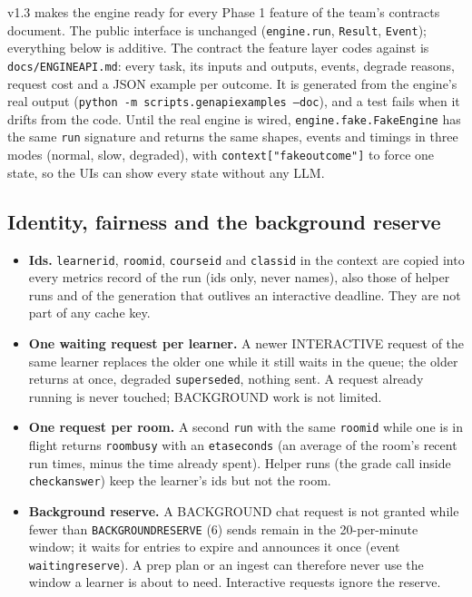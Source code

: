 \documentclass[11pt,a4paper]{article}
\renewcommand{\_}{\origus\allowbreak}
\begin{document}
v1.3 makes the engine ready for every Phase 1 feature of the team's contracts document. The public interface is unchanged
(\texttt{engine.run}, \texttt{Result}, \texttt{Event}); everything below is additive. The contract the feature layer
codes against is \texttt{docs/ENGINE\_API.md}: every task, its inputs and outputs, events, degrade reasons, request cost and a
JSON example per outcome. It is generated from the engine's real output (\texttt{python -m scripts.gen\_api\_examples --doc}),
and a test fails when it drifts from the code. Until the real engine is wired, \texttt{engine.fake.FakeEngine} has the same
\texttt{run} signature and returns the same shapes, events and timings in three modes (normal, slow, degraded), with
\texttt{context["fake\_outcome"]} to force one state, so the UIs can show every state without any LLM.

\subsection{Identity, fairness and the background reserve}

\begin{itemize}[leftmargin=1.4em,itemsep=2pt]
\item \textbf{Ids.} \texttt{learner\_id}, \texttt{room\_id}, \texttt{course\_id} and \texttt{class\_id} in the context are copied into
every metrics record of the run (ids only, never names), also those of helper runs and of the generation that outlives an
interactive deadline. They are not part of any cache key.
\item \textbf{One waiting request per learner.} A newer INTERACTIVE request of the same learner replaces the older one while it
still waits in the queue; the older returns at once, degraded \texttt{superseded}, nothing sent. A request already running is
never touched; BACKGROUND work is not limited.
\item \textbf{One request per room.} A second \texttt{run} with the same \texttt{room\_id} while one is in flight returns
\texttt{room\_busy} with an \texttt{eta\_seconds} (an average of the room's recent run times, minus the time already spent).
Helper runs (the grade call inside \texttt{check\_answer}) keep the learner's ids but not the room.
\item \textbf{Background reserve.} A BACKGROUND chat request is not granted while fewer than \texttt{BACKGROUND\_RESERVE} (6)
sends remain in the 20-per-minute window; it waits for entries to expire and announces it once (event \texttt{waiting\_reserve}).
A prep plan or an ingest can therefore never use the window a learner is about to need. Interactive requests ignore the reserve.
\end{itemize}
\end{document}
